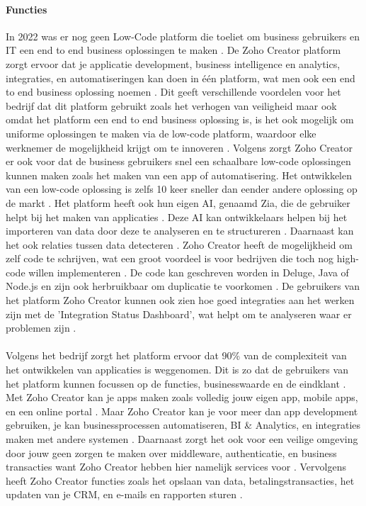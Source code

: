 \paragraph{Functies}
In 2022 was er nog geen Low-Code platform die toeliet om business gebruikers en IT een end to end business oplossingen te maken \autocite{Computer2022}.
De Zoho Creator platform zorgt ervoor dat je applicatie development, business intelligence en analytics, integraties, en automatiseringen kan doen in één platform, wat men ook een end to end business oplossing noemen \autocite{Computer2022}.
Dit geeft verschillende voordelen voor het bedrijf dat dit platform gebruikt zoals het verhogen van veiligheid maar ook omdat het platform een end to end business oplossing is, is het ook mogelijk om uniforme oplossingen te maken via de low-code platform,
waardoor elke werknemer de mogelijkheid krijgt om te innoveren \autocite{Computer2022}. Volgens \textcite{Computer2022} zorgt Zoho Creator er ook voor dat de business gebruikers snel een schaalbare low-code oplossingen kunnen maken zoals het maken van een app of automatisering.
Het ontwikkelen van een low-code oplossing is zelfs 10 keer sneller dan eender andere oplossing op de markt \autocite{Computer2022}. Het platform heeft ook hun eigen AI, genaamd Zia, die de gebruiker helpt bij het maken van applicaties \autocite{Computer2022}. Deze AI
kan ontwikkelaars helpen bij het importeren van data door deze te analyseren en te structureren \autocite{Computer2022}. Daarnaast kan het ook relaties tussen data detecteren \autocite{Computer2022}. 
Zoho Creator heeft de mogelijkheid om zelf code te schrijven, wat een groot voordeel is voor bedrijven die toch nog high-code willen implementeren \autocite{Computer2022}. 
De code kan geschreven worden in Deluge, Java of Node.js en zijn ook herbruikbaar om duplicatie te voorkomen \autocite{Computer2022}.
De gebruikers van het platform Zoho Creator kunnen ook zien hoe goed integraties aan het werken zijn met de 'Integration Status Dashboard', wat helpt om te analyseren waar er problemen zijn \autocite{Computer2022}.
\\ %
\\
Volgens het bedrijf \autocite{ZohoCorporation2024b} zorgt het platform ervoor dat 90\% van de complexiteit van het ontwikkelen van applicaties is weggenomen. Dit is zo dat de gebruikers van het platform
kunnen focussen op de functies, businesswaarde en de eindklant \autocite{ZohoCorporation2024b}.  Met Zoho Creator kan je apps maken zoals volledig jouw eigen app, mobile apps, en een online portal \autocite{ZohoCorporation2024b}.
Maar Zoho Creator kan je voor meer dan app development gebruiken, je kan businessprocessen automatiseren, BI \& Analytics, en integraties maken met andere systemen \autocite{ZohoCorporation2024b}. Daarnaast zorgt het ook voor een veilige omgeving door 
jouw geen zorgen te maken over middleware, authenticatie, en business transacties want Zoho Creator hebben hier namelijk services voor \autocite{ZohoCorporation2024b}. Vervolgens heeft Zoho Creator functies zoals het opslaan van data,
betalingstransacties, het updaten van je CRM, en e-mails en rapporten sturen \autocite{ZohoCorporation2024b}.

